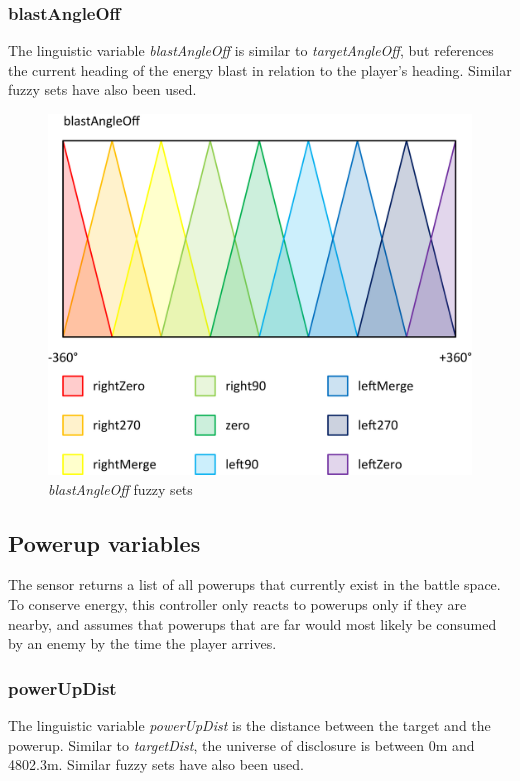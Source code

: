 \subsubsection{blastAngleOff}

The linguistic variable \emph{blastAngleOff} is similar to \emph{targetAngleOff}, but references the current heading of the energy blast in relation to the player's heading. Similar fuzzy sets have also been used.

\begin{figure}[H]
\centering
\caption{\emph{blastAngleOff} fuzzy sets}
\includegraphics[scale=0.08]{./img/pdf/blastAngleOffSets.pdf}
\end{figure}

\subsection{Powerup variables}

The sensor returns a list of all powerups that currently exist in the battle space. To conserve energy, this controller only reacts to powerups only if they are nearby, and assumes that powerups that are far would most likely be consumed by an enemy by the time the player arrives.

\subsubsection{powerUpDist}

The linguistic variable \emph{powerUpDist} is the distance between the target and the powerup. Similar to \emph{targetDist}, the universe of disclosure is between 0m and 4802.3m. Similar fuzzy sets have also been used.

